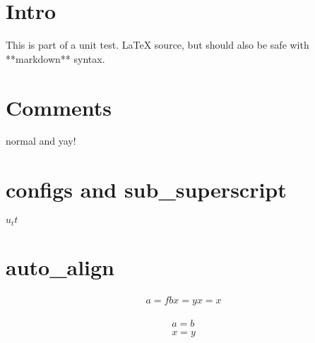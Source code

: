 \documentclass[12pt]{article}
\begin{document}
\section{Intro}
This is part of a unit test. \LaTeX{} source, but should also be safe with **markdown** syntax.

\section{Comments}
normal %
and
yay!

\section{configs and sub_superscript}
$u_tt$

\section{auto_align}
\begin {align}
a = fb %
x = y \label{$u_tt$}
x=x
\end{align}

\begin {align}
a = b \\

x = y
\end{align}
\end{document}
